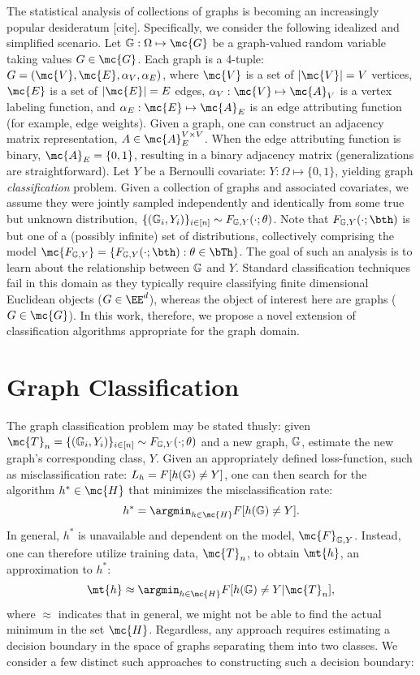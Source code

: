 The statistical analysis of collections of graphs is becoming an increasingly popular desideratum [cite].  Specifically, we consider the following idealized and simplified scenario. Let $\GG: \Omega \mapsto \mc{G}$ be a graph-valued random variable taking values $G\in \mc{G}$. Each graph is a 4-tuple: $G=(\mc{V},\mc{E},\alpha_V,\alpha_E)$, where $\mc{V}$ is a set of $|\mc{V}|=V$ vertices, $\mc{E}$ is a set of $|\mc{E}|=E$ edges, $\alpha_V: \mc{V} \mapsto \mc{A}_V$ is a vertex labeling function, and $\alpha_E: \mc{E} \mapsto \mc{A}_E$ is an edge attributing function (for example, edge weights).  Given a graph, one can construct an adjacency matrix representation, $A \in \mc{A}_E^{V \times V}$.  When the edge attributing function is binary, $\mc{A}_E=\{0,1\}$, resulting in a binary adjacency matrix (generalizations are straightforward).  Let $Y$ be a Bernoulli covariate: $Y: \Omega \mapsto \{0,1\}$, yielding graph \emph{classification} problem.  Given a collection of graphs and associated covariates,  we assume they were jointly sampled independently and identically from some true but unknown distribution, $\{(\mathbb{G}_i,Y_i)\}_{i \in [n]} \sim F_{\mathbb{G},Y}(\cdot; \theta)$.  Note that $F_{\GG,Y}(\cdot; \bth)$ is but one of a (possibly infinite) set of distributions, collectively comprising the model $\mc{F_{\GG,Y}}=\{F_{\GG,Y}(\cdot; \bth) : \theta \in \bTh\}$.  The goal of such an analysis is to learn about the relationship between $\mathbb{G}$ and $Y$.   Standard classification techniques fail in this domain as they typically require classifying finite dimensional Euclidean objects ($G \in \EE^d$), whereas the object of interest here are graphs ($G \in \mc{G}$).   In this work, therefore, we propose a novel extension of classification algorithms appropriate for the graph domain.


\section{Graph Classification} %
\label{sec:graph_classification}


The graph classification problem may be stated thusly: given $\mc{T}_n=\{(\GG_i,Y_i)\}_{i \in [n]} \sim F_{\GG,Y}(\cdot; \theta)$ and a new graph, $\mathbb{G}$, estimate the new graph's corresponding class, $Y$.  Given an appropriately defined loss-function, such as misclassification rate: $L_h=F[h(\mathbb{G}) \neq Y]$, one can then search for the algorithm $h^* \in \mc{H}$ that minimizes the misclassification rate:
\begin{align}
	h^* = \argmin_{h \in \mc{H}} F[h(\GG) \neq Y].
\end{align}
In general, $h^*$ is unavailable and dependent on the model, $\mc{F}_{\GG,Y}$.  Instead, one can therefore utilize training data, $\mc{T}_n$, to obtain $\mt{h}$, an approximation to $h^*$:
\begin{align}
	\mt{h} \approx \argmin_{h \in \mc{H}} F[h(\GG) \neq Y | \mc{T}_n],
\end{align}
where $\approx$ indicates that in general, we might not be able to find the actual minimum in the set $\mc{H}$. Regardless, any approach requires estimating a decision boundary in the space of graphs separating them into two classes.  We consider a few distinct such approaches to constructing such a decision boundary:

